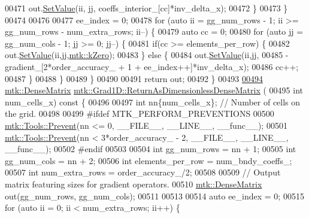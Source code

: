 \begin{DoxyCode}
{{00471       out.\hyperlink{classmtk_1_1DenseMatrix_a784ce5784109ac86bfb9d8562b334b13}{SetValue}(ii, jj, coeffs\_interior\_[cc]*inv\_delta\_x);
00472     \}
00473   \}
00474 
00476 
00477   ee\_index = 0;
00478   \textcolor{keywordflow}{for} (\textcolor{keyword}{auto} ii = gg\_num\_rows - 1; ii >= gg\_num\_rows - num\_extra\_rows; ii--) \{
00479     \textcolor{keyword}{auto} cc = 0;
00480     \textcolor{keywordflow}{for} (\textcolor{keyword}{auto} jj = gg\_num\_cols - 1; jj >= 0; jj--) \{
00481       \textcolor{keywordflow}{if}(cc >= elements\_per\_row) \{
00482         out.\hyperlink{classmtk_1_1DenseMatrix_a784ce5784109ac86bfb9d8562b334b13}{SetValue}(ii,jj,\hyperlink{group__c01-roots_ga59a451a5fae30d59649bcda274fea271}{mtk::kZero});
00483       \} \textcolor{keywordflow}{else} \{
00484         out.\hyperlink{classmtk_1_1DenseMatrix_a784ce5784109ac86bfb9d8562b334b13}{SetValue}(ii,jj,
00485                     -gradient\_[2*order\_accuracy\_ + 1 + ee\_index++]*inv\_delta\_x);
00486         cc++;
00487       \}
00488      \}
00489   \}
00490 
00491   \textcolor{keywordflow}{return} out;
00492 \}
00493 
\hypertarget{mtk__grad__1d_8cc_source_l00494}{}\hyperlink{classmtk_1_1Grad1D_ab07e6a15edca32534ae3d1a8ccaf1c42}{00494} \hyperlink{classmtk_1_1DenseMatrix}{mtk::DenseMatrix} \hyperlink{classmtk_1_1Grad1D_ab07e6a15edca32534ae3d1a8ccaf1c42}{mtk::Grad1D::ReturnAsDimensionlessDenseMatrix}
      (
00495   \textcolor{keywordtype}{int} num\_cells\_x)\textcolor{keyword}{ const }\{
00496 
00497   \textcolor{keywordtype}{int} nn\{num\_cells\_x\}; \textcolor{comment}{// Number of cells on the grid.}
00498 
00499 \textcolor{preprocessor}{  #ifdef MTK\_PERFORM\_PREVENTIONS}
00500   \hyperlink{classmtk_1_1Tools_a332324c6f25e66be9dff48c5987a3b9f}{mtk::Tools::Prevent}(nn <= 0, \_\_FILE\_\_, \_\_LINE\_\_, \_\_func\_\_);
00501   \hyperlink{classmtk_1_1Tools_a332324c6f25e66be9dff48c5987a3b9f}{mtk::Tools::Prevent}(nn < 3*order\_accuracy\_ - 2, \_\_FILE\_\_, \_\_LINE\_\_, \_\_func\_\_);
00502 \textcolor{preprocessor}{  #endif}
00503 
00504   \textcolor{keywordtype}{int} gg\_num\_rows = nn + 1;
00505   \textcolor{keywordtype}{int} gg\_num\_cols = nn + 2;
00506   \textcolor{keywordtype}{int} elements\_per\_row = num\_bndy\_coeffs\_;
00507   \textcolor{keywordtype}{int} num\_extra\_rows = order\_accuracy\_/2;
00508 
00509   \textcolor{comment}{// Output matrix featuring sizes for gradient operators.}
00510   \hyperlink{classmtk_1_1DenseMatrix}{mtk::DenseMatrix} out(gg\_num\_rows, gg\_num\_cols);
00511 
00513 
00514   \textcolor{keyword}{auto} ee\_index = 0;
00515   \textcolor{keywordflow}{for} (\textcolor{keyword}{auto} ii = 0; ii < num\_extra\_rows; ii++) \{
}}
\end{DoxyCode}
